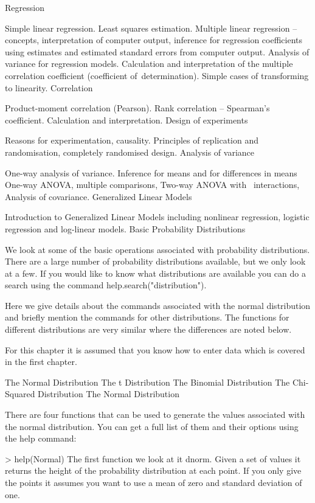 \documentclass[a4paper,12pt]{article}
\begin{document}
Regression

Simple linear regression. Least squares estimation.
Multiple linear regression – concepts, interpretation of computer output, inference for regression coefficients using estimates and estimated standard errors from computer output.
Analysis of variance for regression models.
Calculation and interpretation of the multiple correlation coefficient (coefficient of determination).
Simple cases of transforming to linearity.
Correlation

Product-moment correlation (Pearson).
Rank correlation – Spearman’s coefficient.
Calculation and interpretation.
Design of experiments

Reasons for experimentation, causality.
Principles of replication and randomisation, completely randomised design.
Analysis of variance

One-way analysis of variance.
Inference for means and for differences in means
One-way ANOVA, multiple comparisons,
Two-way ANOVA with  interactions,
Analysis of covariance.
Generalized Linear Models

Introduction to Generalized Linear Models including nonlinear regression, logistic regression and log-linear models.
Basic Probability Distributions

We look at some of the basic operations associated with probability distributions. There are a large number of probability distributions available, but we only look at a few. If you would like to know what distributions are available you can do a search using the command help.search("distribution").

Here we give details about the commands associated with the normal distribution and briefly mention the commands for other distributions. The functions for different distributions are very similar where the differences are noted below.

For this chapter it is assumed that you know how to enter data which is covered in the first chapter.

The Normal Distribution
The t Distribution
The Binomial Distribution
The Chi-Squared Distribution
The Normal Distribution

There are four functions that can be used to generate the values associated with the normal distribution. You can get a full list of them and their options using the help command:

> help(Normal)
The first function we look at it dnorm. Given a set of values it returns the height of the probability distribution at each point. If you only give the points it assumes you want to use a mean of zero and standard deviation of one. 
\end{document}
